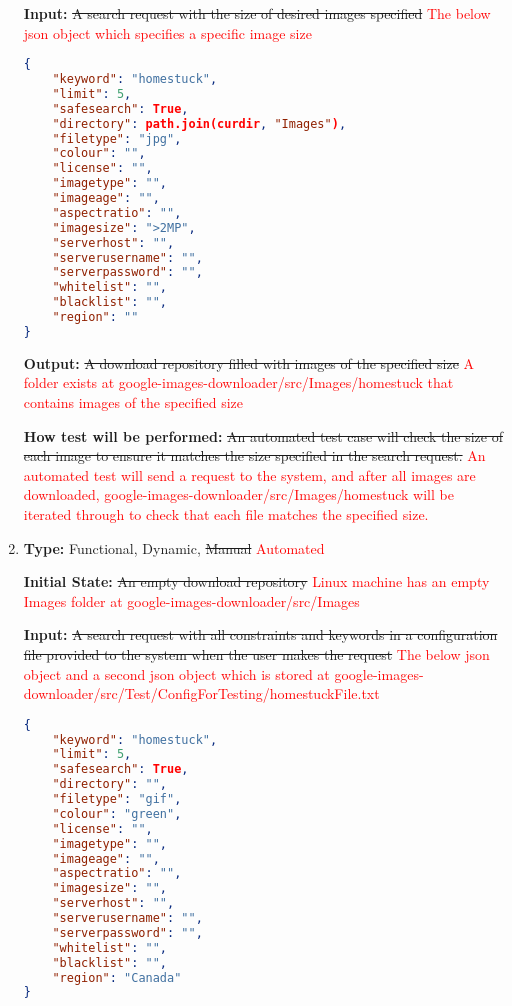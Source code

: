 \documentclass[12pt, titlepage]{article}
\begin{document}
\begin{enumerate}[label=FR-SQ\arabic*:, wide=0pt, leftmargin=*]
\textbf{Input:} \sout{A search request with the size of desired images specified} 
\textcolor{red}{The below json object which specifies a specific image size}
\begin{lstlisting}[language=json,firstnumber=1]
{
    "keyword": "homestuck",
    "limit": 5,
    "safesearch": True,
    "directory": path.join(curdir, "Images"),
    "filetype": "jpg",
    "colour": "",
    "license": "",
    "imagetype": "",
    "imageage": "",
    "aspectratio": "",
    "imagesize": ">2MP",
    "serverhost": "",
    "serverusername": "",
    "serverpassword": "",
    "whitelist": "",
    "blacklist": "",
    "region": ""
}
\end{lstlisting}
					
\textbf{Output:} \sout{A download repository filled with images of the specified size}
\textcolor{red}{A folder exists at google-images-downloader/src/Images/homestuck that contains
images of the specified size}
					
\textbf{How test will be performed:} \sout{An automated test case will check the size of each image to ensure it 
matches the size specified in the search request.}
\textcolor{red}{An automated test will send a request to the system, and after all images are downloaded, 
google-images-downloader/src/Images/homestuck will be iterated through to check that each file matches 
the specified size.}

\item \phantom{empty}

\textbf{Type:} Functional, Dynamic, \sout{Manual} \textcolor{red}{Automated}
					
\textbf{Initial State:} \sout{An empty download repository}
\textcolor{red}{Linux machine has an empty Images folder at google-images-downloader/src/Images}
					
\textbf{Input:} \sout{A search request with all constraints and keywords in a configuration file provided to 
the system when the user makes the request}
\textcolor{red}{The below json object and a second json object which is stored at 
google-images-downloader/src/Test/ConfigForTesting/homestuckFile.txt}
\begin{lstlisting}[language=json,firstnumber=1]
{
    "keyword": "homestuck",
    "limit": 5,
    "safesearch": True,
    "directory": "",
    "filetype": "gif",
    "colour": "green",
    "license": "",
    "imagetype": "",
    "imageage": "",
    "aspectratio": "",
    "imagesize": "",
    "serverhost": "",
    "serverusername": "",
    "serverpassword": "",
    "whitelist": "",
    "blacklist": "",
    "region": "Canada"
}
\end{lstlisting}
					

\end{enumerate}
\end{document}
